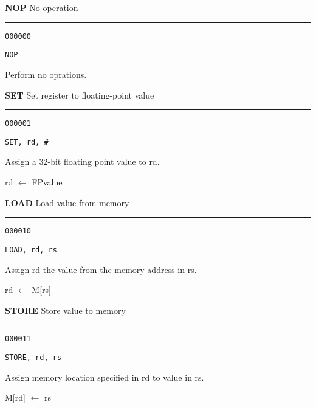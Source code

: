 \documentclass{article}
\begin{document}
\pagebreak


\flushleft
\LARGE\textbf{NOP} \large \hfill No operation

\kern-3pt
\noindent\rule{16.5cm}{0.4pt}
\normalsize

{\large
	 \texttt{000000} \par
	\smallbreak
	 \texttt{NOP} \par
	\smallbreak
	 Perform no oprations. \par
}

\bigskip\bigskip

\flushleft
\LARGE\textbf{SET} \large \hfill Set register to floating-point value

\kern-3pt
\noindent\rule{16.5cm}{0.4pt}
\normalsize

{\large
	 \texttt{000001} \par
	\smallbreak
	 \texttt{SET, rd, \#<32-bit FP value>} \par
	\smallbreak
	 Assign a 32-bit floating point value to rd. \par
	\smallbreak
	 rd $\leftarrow$ FPvalue \par
}

\bigskip\bigskip

\flushleft
\LARGE\textbf{LOAD} \large \hfill Load value from memory

\kern-3pt
\noindent\rule{16.5cm}{0.4pt}
\normalsize

{\large
	 \texttt{000010} \par
	\smallbreak
	 \texttt{LOAD, rd, rs} \par
	\smallbreak
	 Assign rd the value from the memory address in rs. \par
	\smallbreak
	 rd $\leftarrow$ M[rs] \par
}

\bigskip\bigskip

\flushleft
\LARGE\textbf{STORE} \large \hfill Store value to memory

\kern-3pt
\noindent\rule{16.5cm}{0.4pt}
\normalsize

{\large
	 \texttt{000011} \par
	\smallbreak
	 \texttt{STORE, rd, rs} \par
	\smallbreak
	 Assign memory location specified in rd to value in rs. \par
	\smallbreak
	 M[rd] $\leftarrow$ rs \par
}
\end{document}
